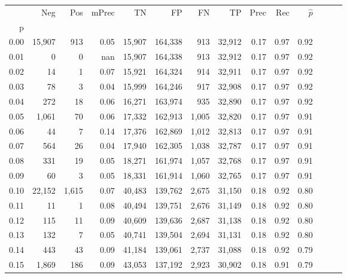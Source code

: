 \begin{tabular}{rrrrrrrrrrrrrr}
\toprule
{} &     Neg &    Pos & mPrec &       TN &       FP &      FN &      TP &  Prec &   Rec & $\hat{p}$ \\
p    &         &        &       &          &          &         &         &       &       &           \\
\midrule
0.00 &  15,907 &    913 &  0.05 &   15,907 &  164,338 &     913 &  32,912 &  0.17 &  0.97 &      0.92 \\
0.01 &       0 &      0 &   nan &   15,907 &  164,338 &     913 &  32,912 &  0.17 &  0.97 &      0.92 \\
0.02 &      14 &      1 &  0.07 &   15,921 &  164,324 &     914 &  32,911 &  0.17 &  0.97 &      0.92 \\
0.03 &      78 &      3 &  0.04 &   15,999 &  164,246 &     917 &  32,908 &  0.17 &  0.97 &      0.92 \\
0.04 &     272 &     18 &  0.06 &   16,271 &  163,974 &     935 &  32,890 &  0.17 &  0.97 &      0.92 \\
0.05 &   1,061 &     70 &  0.06 &   17,332 &  162,913 &   1,005 &  32,820 &  0.17 &  0.97 &      0.91 \\
0.06 &      44 &      7 &  0.14 &   17,376 &  162,869 &   1,012 &  32,813 &  0.17 &  0.97 &      0.91 \\
0.07 &     564 &     26 &  0.04 &   17,940 &  162,305 &   1,038 &  32,787 &  0.17 &  0.97 &      0.91 \\
0.08 &     331 &     19 &  0.05 &   18,271 &  161,974 &   1,057 &  32,768 &  0.17 &  0.97 &      0.91 \\
0.09 &      60 &      3 &  0.05 &   18,331 &  161,914 &   1,060 &  32,765 &  0.17 &  0.97 &      0.91 \\
0.10 &  22,152 &  1,615 &  0.07 &   40,483 &  139,762 &   2,675 &  31,150 &  0.18 &  0.92 &      0.80 \\
0.11 &      11 &      1 &  0.08 &   40,494 &  139,751 &   2,676 &  31,149 &  0.18 &  0.92 &      0.80 \\
0.12 &     115 &     11 &  0.09 &   40,609 &  139,636 &   2,687 &  31,138 &  0.18 &  0.92 &      0.80 \\
0.13 &     132 &      7 &  0.05 &   40,741 &  139,504 &   2,694 &  31,131 &  0.18 &  0.92 &      0.80 \\
0.14 &     443 &     43 &  0.09 &   41,184 &  139,061 &   2,737 &  31,088 &  0.18 &  0.92 &      0.79 \\
0.15 &   1,869 &    186 &  0.09 &   43,053 &  137,192 &   2,923 &  30,902 &  0.18 &  0.91 &      0.79 \\

\end{tabular}
